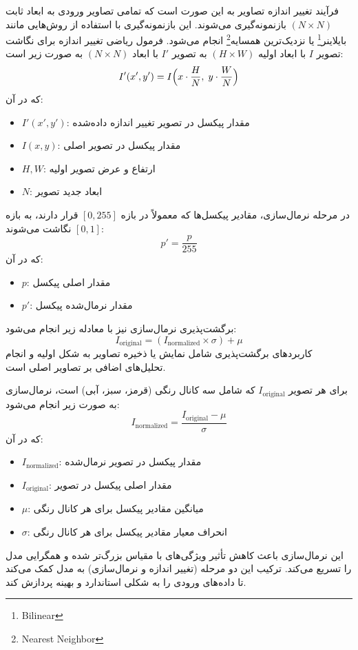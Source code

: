 فرآیند تغییر اندازه تصاویر به این صورت است که تمامی تصاویر ورودی به ابعاد ثابت \(( N \times N )\) بازنمونه‌گیری می‌شوند. این بازنمونه‌گیری با استفاده از روش‌هایی مانند بایلاینر\footnote{Bilinear} یا نزدیک‌ترین همسایه\footnote{Nearest Neighbor} انجام می‌شود. فرمول ریاضی تغییر اندازه برای نگاشت تصویر \( I \) با ابعاد اولیه \(( H \times W )\) به تصویر \( I' \) با ابعاد \(( N \times N )\) به صورت زیر است:
\[
I'(x', y') = I\Bigl( x \cdot \frac{H}{N}, \; y \cdot \frac{W}{N}\Bigr)
\]
که در آن:
\begin{itemize}
    \item \( I'(x',y') \): مقدار پیکسل در تصویر تغییر اندازه داده‌شده
    \item \( I(x,y) \): مقدار پیکسل در تصویر اصلی
    \item \( H, W \): ارتفاع و عرض تصویر اولیه
    \item \( N \): ابعاد جدید تصویر
\end{itemize}

در مرحله نرمال‌سازی، مقادیر پیکسل‌ها که معمولاً در بازه \([0, 255]\) قرار دارند، به بازه \([0, 1]\) نگاشت می‌شوند:
\[
p' = \frac{p}{255}
\]
که در آن:
\begin{itemize}
    \item \( p \): مقدار اصلی پیکسل
    \item \( p' \): مقدار نرمال‌شده پیکسل
\end{itemize}

برگشت‌پذیری نرمال‌سازی نیز با معادله زیر انجام می‌شود:
\[
I_{\text{original}} = (I_{\text{normalized}} \times \sigma) + \mu
\]
کاربردهای برگشت‌پذیری شامل نمایش یا ذخیره تصاویر به شکل اولیه و انجام تحلیل‌های اضافی بر تصاویر اصلی است.

برای هر تصویر \( I_{\text{original}} \) که شامل سه کانال رنگی (قرمز، سبز، آبی) است، نرمال‌سازی به صورت زیر انجام می‌شود:
\[
I_{\text{normalized}} = \frac{I_{\text{original}} - \mu}{\sigma}
\]
که در آن:
\begin{itemize}
    \item \( I_{\text{normalized}} \): مقدار پیکسل در تصویر نرمال‌شده
    \item \( I_{\text{original}} \): مقدار اصلی پیکسل در تصویر
    \item \(\mu\): میانگین مقادیر پیکسل برای هر کانال رنگی
    \item \(\sigma\): انحراف معیار مقادیر پیکسل برای هر کانال رنگی
\end{itemize}

این نرمال‌سازی باعث کاهش تأثیر ویژگی‌های با مقیاس بزرگ‌تر شده و همگرایی مدل را تسریع می‌کند. ترکیب این دو مرحله (تغییر اندازه و نرمال‌سازی) به مدل کمک می‌کند تا داده‌های ورودی را به شکلی استاندارد و بهینه پردازش کند.

